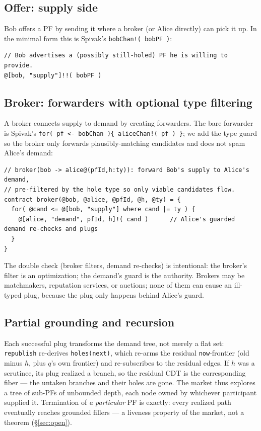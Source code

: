 \documentclass[11pt]{article}
\newcommand{\code}[1]{\lstinline[language=rho,basicstyle=\ttfamily\small]|#1|}
\begin{document}
\subsection{Offer: supply side}\label{sec:offer}
Bob offers a PF by sending it where a broker (or Alice directly) can pick it up. In the minimal form
this is Spivak's \code{bobChan!( bobPF )}:
\begin{lstlisting}[language=rho]
// Bob advertises a (possibly still-holed) PF he is willing to provide.
@[bob, "supply"]!!( bobPF )
\end{lstlisting}

\subsection{Broker: forwarders with optional type filtering}\label{sec:broker}
A broker connects supply to demand by creating forwarders. The bare forwarder is Spivak's
\code{for( pf <- bobChan ){ aliceChan!( pf ) }}; we add the type guard so the broker only forwards
plausibly-matching candidates and does not spam Alice's demand:
\begin{lstlisting}[language=rho]
// broker(bob -> alice@(pfId,h:ty)): forward Bob's supply to Alice's demand,
// pre-filtered by the hole type so only viable candidates flow.
contract broker(@bob, @alice, @pfId, @h, @ty) = {
  for( @cand <= @[bob, "supply"] where cand |= ty ) {
    @[alice, "demand", pfId, h]!( cand )      // Alice's guarded demand re-checks and plugs
  }
}
\end{lstlisting}

\noindent
The double check (broker filters, demand re-checks) is intentional: the broker's filter is an
optimization; the demand's guard is the authority. Brokers may be matchmakers, reputation services, or
auctions; none of them can cause an ill-typed plug, because the plug only happens behind Alice's
guard.

\subsection{Partial grounding and recursion}
Each successful plug transforms the demand tree, not merely a flat set: \code{republish} re-derives
\code{holes(next)}, which re-arms the residual \code{now}-frontier (old minus $h$, plus $q$'s own
frontier) and re-subscribes to the residual edges. If $h$ was a scrutinee, its plug realized a branch,
so the residual CDT is the corresponding fiber --- the untaken branches and their holes are gone. The
market thus explores a tree of sub-PFs of unbounded depth, each node owned by whichever participant
supplied it. Termination of \emph{a particular} PF is exactly: every realized path eventually reaches
grounded fillers --- a liveness property of the market, not a theorem (\S\ref{sec:open}).
\end{document}
